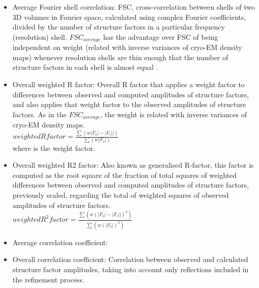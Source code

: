 \begin{itemize}
\begin{itemize}
\begin{itemize}
     \item Average Fourier shell correlation: FSC, cross-correlation between shells of two 3D volumes in Fourier space, calculated using complex Fourier coefficients, divided by the number of structure factors in a particular frequency (resolution) shell. \begin{math}FSC_{average}\end{math} has the advantage over FSC of being independent on weight (related with inverse variances of cryo-EM density maps) whenever resolution shells are thin enough that the number of structure factors in each shell is almost equal \citep{brown2015}.
     
     \item Overall weighted R factor: Overall R factor that applies a weight factor to differences between observed and computed amplitudes of structure factors, and also applies that weight factor to the observed amplitudes of structure factors. As in the \begin{math}FSC_{average}\end{math}, the weight is related with inverse variances of cryo-EM density maps.\\
     
     \begin{math}
           weighted R factor = \frac{\sum(w |F_o|-|F_c||)}{\sum(w |F_o|)}
     \end{math}\\
     
     where  is the weight factor.
     
     \item Overall weighted R2 factor: Also known as generalised R-factor, this factor is computed as the root square of the fraction of total squares of weighted differences between observed and computed amplitudes of structure factors, previously scaled, regarding the total of weighted squares of observed amplitudes of structure factors.\\
     
     \begin{math}
           weighted R^2 factor = \frac{\sum(w (|F_o|-|F_c||)^2)}{\sum(w (|F_o|)^2)}
     \end{math}\\
     
     \item Average correlation coefficient:
     
     \item Overall correlation coefficient: Correlation between observed and calculated structure factor amplitudes, taking into account only reflections included in the refinement process.
     

\end{itemize}
\end{itemize}
\end{itemize}

